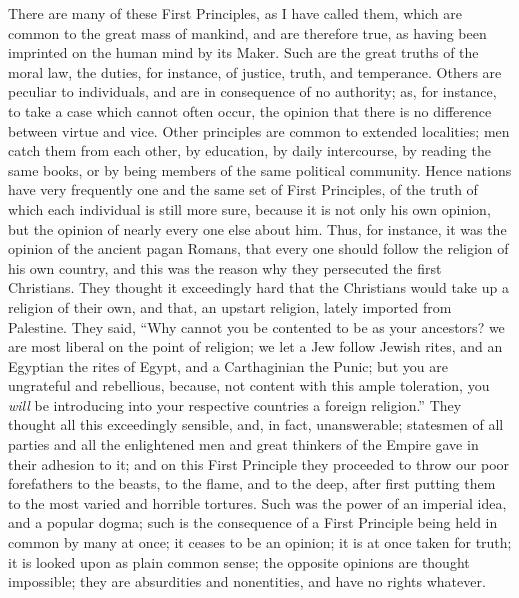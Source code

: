 There are many of these First Principles, as I have
called them, which are common to the great mass of
mankind, and are therefore true, as having been imprinted
on the human mind by its Maker. Such are the great truths
of the moral law, the duties, for instance, of justice,
truth, and temperance. Others are peculiar to
individuals, and are in consequence of no authority; as,
for instance, to take a case which cannot often occur,
the opinion that there is no difference between virtue
and vice. Other principles are common to extended
localities; men catch them from each other, by education,
by daily intercourse, by reading the same books, or by
being members of the same political community. Hence
nations have very frequently one and the same set of
First Principles, of the truth of which each individual
is still more sure, because it is not only his own
opinion, but the opinion of nearly every one else about
him. Thus, for instance, it was the opinion of the
ancient pagan Romans, that every one should follow the
religion of his own country, and this was the reason why
they persecuted the first Christians. They thought it
exceedingly hard that the Christians would take up a
religion of their own, and that, an upstart religion,
lately imported from Palestine. They said, ``Why
cannot you be contented to be as your ancestors? we are
most liberal on the point of religion; we let a Jew
follow Jewish rites, and an Egyptian the rites of Egypt,
and a Carthaginian the Punic; but you are ungrateful and
rebellious, because, not content with this ample
toleration, you \emph{will} be introducing into your
respective countries a foreign religion.'' They
thought all this exceedingly sensible, and, in fact,
unanswerable; statesmen of all parties and all the
enlightened men and great thinkers of the Empire gave in
their adhesion to it; and on this First Principle they
proceeded to throw our poor forefathers to the beasts, to
the flame, and to the deep, after first putting them to
the most varied and horrible tortures. Such was the power
of an imperial idea, and a popular dogma; such is the
consequence of a First Principle being held in common by
many at once; it ceases to be an opinion; it is at once
taken for truth; it is looked upon as plain common sense;
the opposite opinions are thought impossible; they are
absurdities and nonentities, and have no rights whatever.

